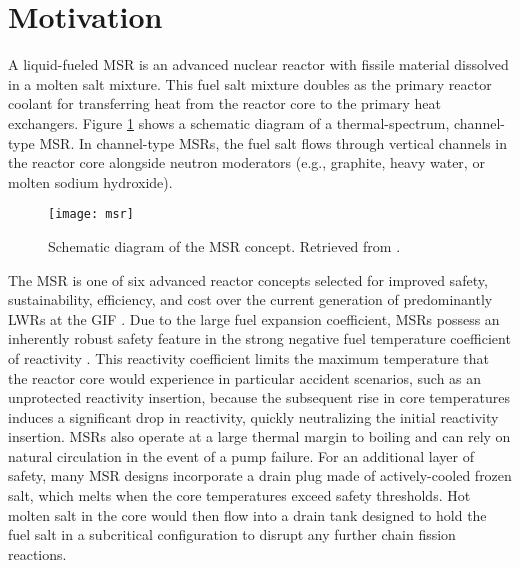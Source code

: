 \section{Motivation}

A liquid-fueled \gls{MSR} is an advanced nuclear reactor with fissile material
dissolved in a molten salt mixture. This fuel salt mixture doubles as the primary reactor coolant
for transferring heat from the reactor core to the primary heat exchangers. Figure \ref{fig:msr}
shows a schematic diagram of a thermal-spectrum, channel-type \gls{MSR}. In channel-type
\glspl{MSR}, the fuel salt flows through vertical channels in the reactor core alongside neutron
moderators (e.g., graphite, heavy water, or molten sodium hydroxide). 
%
\begin{figure}[htb!]
	\centering
	\texttt{[image: msr]}
	\caption{Schematic diagram of the \gls{MSR} concept. Retrieved from
	\cite{u.s._doe_nuclear_energy_research_advisory_committee_technology_2002}.}
	\label{fig:msr}
\end{figure}

The \gls{MSR} is one of six advanced reactor concepts selected for improved safety, sustainability,
efficiency, and cost over the current generation of predominantly \glspl{LWR} at the \gls{GIF}
\cite{u.s._doe_nuclear_energy_research_advisory_committee_technology_2002}.
Due to the large fuel expansion coefficient, \glspl{MSR} possess an inherently robust
safety feature in the strong negative fuel temperature coefficient of
reactivity \cite{elsheikh_safety_2013}. This reactivity coefficient limits the
maximum temperature that the reactor core would experience in particular accident
scenarios, such as an unprotected reactivity insertion, because the subsequent
rise in core temperatures induces a significant drop in reactivity,
quickly neutralizing the initial reactivity insertion. \glspl{MSR} also
operate at a large thermal margin to boiling and can rely on natural
circulation in the event of a pump failure. For an additional layer of safety, many \gls{MSR}
designs incorporate a drain plug made of actively-cooled frozen salt, which
melts when the core temperatures exceed safety thresholds. Hot molten salt
in the core would then flow into a drain tank designed to hold the fuel salt in
a subcritical configuration to disrupt any further chain fission reactions.

